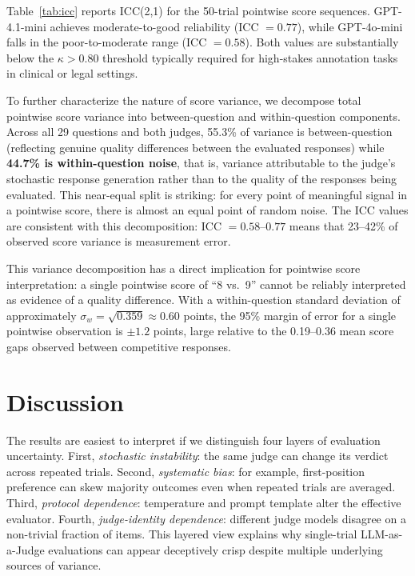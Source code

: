 \documentclass{ijclclp}
\begin{document}
Table~\ref{tab:icc} reports ICC(2,1) for the 50-trial pointwise score sequences. GPT-4.1-mini achieves moderate-to-good reliability (ICC $= 0.77$), while GPT-4o-mini falls in the poor-to-moderate range (ICC $= 0.58$). Both values are substantially below the $\kappa > 0.80$ threshold typically required for high-stakes annotation tasks in clinical or legal settings.

To further characterize the nature of score variance, we decompose total pointwise score variance into between-question and within-question components. Across all 29 questions and both judges, 55.3\% of variance is between-question (reflecting genuine quality differences between the evaluated responses) while \textbf{44.7\% is within-question noise}, that is, variance attributable to the judge's stochastic response generation rather than to the quality of the responses being evaluated. This near-equal split is striking: for every point of meaningful signal in a pointwise score, there is almost an equal point of random noise. The ICC values are consistent with this decomposition: ICC $= 0.58$--$0.77$ means that 23--42\% of observed score variance is measurement error.

This variance decomposition has a direct implication for pointwise score interpretation: a single pointwise score of ``8 vs.\ 9'' cannot be reliably interpreted as evidence of a quality difference. With a within-question standard deviation of approximately $\sigma_w = \sqrt{0.359} \approx 0.60$ points, the 95\% margin of error for a single pointwise observation is $\pm 1.2$ points, large relative to the 0.19--0.36 mean score gaps observed between competitive responses.

\section{Discussion}

The results are easiest to interpret if we distinguish four layers of evaluation uncertainty. First, \emph{stochastic instability}: the same judge can change its verdict across repeated trials. Second, \emph{systematic bias}: for example, first-position preference can skew majority outcomes even when repeated trials are averaged. Third, \emph{protocol dependence}: temperature and prompt template alter the effective evaluator. Fourth, \emph{judge-identity dependence}: different judge models disagree on a non-trivial fraction of items. This layered view explains why single-trial LLM-as-a-Judge evaluations can appear deceptively crisp despite multiple underlying sources of variance.
\end{document}

